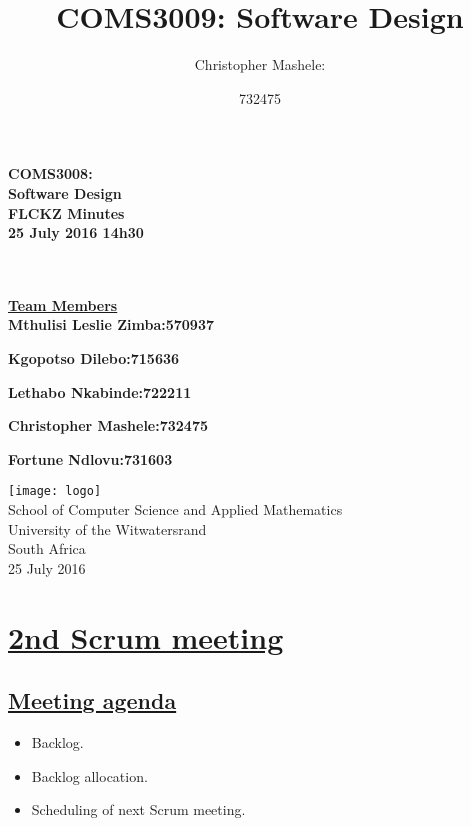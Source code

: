 \documentclass{article}
\title{COMS3009: Software Design}
\author{
	Christopher Mashele:\\
	\and
	732475\\
	}
\begin{document}
\begin{titlepage}
	
		\hspace{0.5cm}
		\huge
		\center
		\textbf{COMS3008:\\ Software Design}\\

		\vspace*{1cm}
		\Large
		\hspace{2cm}
		\center
		\textbf{FLCKZ Minutes\\ 25 July 2016 14h30}\\\\\\
		\vspace*{2cm}
		\normalsize
		\hspace{2.5cm}

		\textbf{\underline{Team Members}}\\

		\textbf{Mthulisi Leslie Zimba:\hfill570937}

		\textbf{Kgopotso Dilebo:\hfill 715636}

		\textbf{Lethabo Nkabinde:\hfill 722211}

		\textbf{Christopher Mashele:\hfill 732475}
		
		\textbf{Fortune Ndlovu:\hfill 731603}

		
		\vspace{2cm}
		\normalsize
		\hspace{4cm}
		\centre
		\texttt{[image: logo]}\\
		\hspace{3cm} School of Computer Science and Applied Mathematics\\
		\hspace{3cm}University of the Witwatersrand\\
		\hspace{3cm} South Africa\\
		\hspace{3cm} 25 July 2016 \\
	
\end{titlepage}

\section*{\underline{2nd Scrum meeting}}
\subsection*{\underline{Meeting agenda}}
\begin{itemize}
	\item Backlog.
	\item Backlog allocation.
	\item Scheduling of next Scrum meeting. 
\end{itemize}
\end{document}
